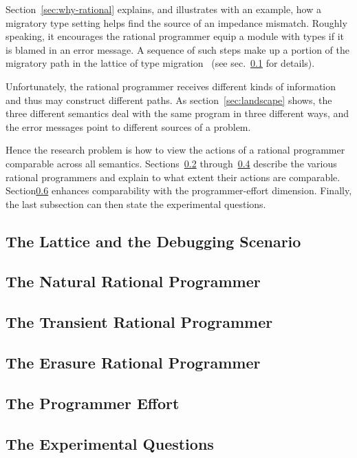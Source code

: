 
Section~\ref{sec:why-rational} explains, and illustrates with an example, how a
migratory type setting helps find the source of an impedance mismatch. Roughly
speaking, it encourages the rational programmer equip a module with types if it
is blamed in an error message. A sequence of such steps make up a portion of the
migratory path in the lattice of type migration~\cite{tfgnvf-popl-2016} (see
sec.~\ref{sub:stuff} for details). 

Unfortunately, the rational programmer receives different kinds of information
and thus may construct different paths. As section~\ref{sec:landscape} shows,
the three different semantics deal with the same program in three different
ways, and the error messages point to different sources of a problem.

Hence the research problem is how to view the actions of a rational programmer
comparable across all semantics. Sections~\ref{sub:natural}
through~\ref{sub:erasure} describe the various rational programmers and explain
to what extent their actions are comparable. Section\ref{sub:experiment}
enhances comparability with the programmer-effort dimension. Finally, the last
subsection can then state the experimental questions. 

\def\rsub#1#2{\subsection{#2} \label{sub:#1} }

\rsub{stuff}     {The Lattice and the Debugging Scenario} 
\rsub{natural}   {The Natural Rational Programmer} 
\rsub{transient} {The Transient Rational Programmer} 
\rsub{erasure}   {The Erasure Rational Programmer} 
\rsub{effort}    {The Programmer Effort} \label{subsec:effort}
\rsub{experiment}{The Experimental Questions} 

